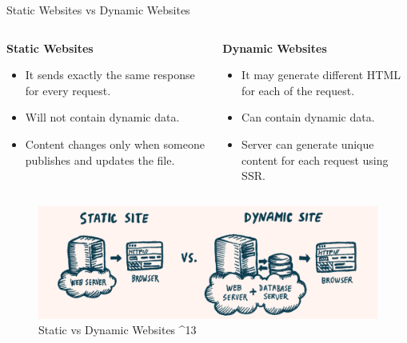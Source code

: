 \documentclass[aspectratio=169,9pt]{beamer}
\begin{document}
\begin{frame}{Static Websites vs Dynamic Websites}
\vspace{2em}
\begin{columns}
\centering
\begin{column}{0.47\textwidth}
        \textbf{Static Websites}
        \vspace{1em}
        \begin{itemize}
            \item It sends exactly the same response for every request.
            \item Will not contain dynamic data.
            \item Content changes only when someone publishes and updates the file.
        \end{itemize}
    \end{column}
    \begin{column}{0.47\textwidth}
       \textbf{ Dynamic Websites}
       \vspace{1em}
        \begin{itemize}
            \item It may generate different HTML for each of the request.
            \item Can contain dynamic data.
            \item Server can generate unique content for each request using SSR.
        \end{itemize}
    \end{column}
\end{columns}
\vspace{1em}
    	\begin{figure}
        \begin{center}
            \includegraphics[scale=.25]{images/static-dynamic.png}
            \caption{Static vs Dynamic Websites ^{13}}
        \end{center} 
    \end{figure}
\end{frame}
\end{document}
